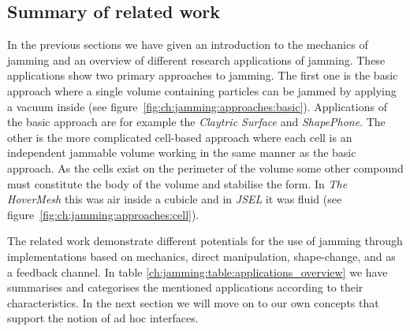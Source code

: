 \subsection{Summary of related work}

In the previous sections we have given an introduction to the mechanics of jamming and an overview of different research applications of jamming.
These applications show two primary approaches to jamming.
The first one is the basic approach where a single volume containing particles can be jammed by applying a vacuum inside (see figure~\ref{fig:ch:jamming:approaches:basic}).
Applications of the basic approach are for example the \emph{Claytric Surface} and \emph{ShapePhone}.
The other is the more complicated cell-based approach where each cell is an independent jammable volume working in the same manner as the basic approach.
As the cells exist on the perimeter of the volume some other compound must constitute the body of the volume and stabilise the form.
In \emph{The HoverMesh} this was air inside a cubicle and in \emph{JSEL} it was fluid (see figure~\ref{fig:ch:jamming:approaches:cell}).

The related work demonstrate different potentials for the use of jamming through implementations based on mechanics, direct manipulation, shape-change, and as a feedback channel.
In table \ref{ch:jamming:table:applications_overview} we have summarises and categorises the mentioned applications according to their characteristics.
In the next section we will move on to our own concepts that support the notion of ad hoc interfaces.

